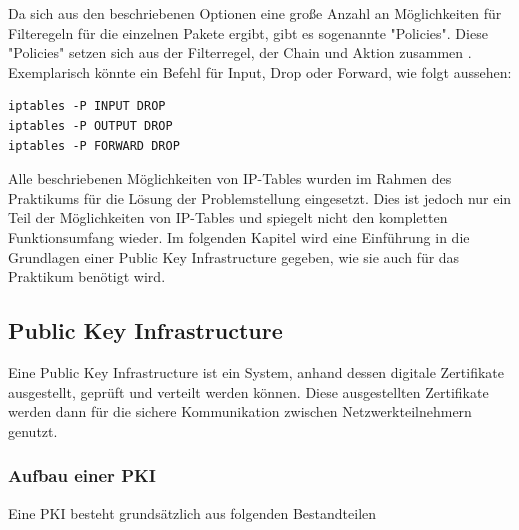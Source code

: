 \documentclass[
a4paper,     %
 headsepline, %
footsepline, %
titlepage,   %
 halfparskip,     %
 fleqn,       %
12pt         %
]{scrartcl}  %
\begin{document}
Da sich aus den beschriebenen Optionen eine große Anzahl an Möglichkeiten für Filteregeln für die einzelnen Pakete ergibt, gibt es sogenannte "Policies". Diese "Policies" setzen sich aus der Filterregel, der Chain und Aktion zusammen \cite{iptables-1}. Exemplarisch könnte ein Befehl für Input, Drop oder Forward, wie folgt aussehen: 
\begin{lstlisting}[caption={Policies},label=lst:policy]
iptables -P INPUT DROP
iptables -P OUTPUT DROP
iptables -P FORWARD DROP
\end{lstlisting}

Alle beschriebenen Möglichkeiten von IP-Tables wurden im Rahmen des Praktikums für die Lösung der Problemstellung eingesetzt. Dies ist jedoch nur ein Teil der Möglichkeiten von IP-Tables und spiegelt nicht den kompletten Funktionsumfang wieder. 
Im folgenden Kapitel wird eine Einführung in die Grundlagen einer Public Key Infrastructure gegeben, wie sie auch für das Praktikum benötigt wird.
\subsection{Public Key Infrastructure}\label{PKI}
Eine Public Key Infrastructure ist ein System, anhand dessen digitale Zertifikate ausgestellt, geprüft und verteilt werden können. Diese ausgestellten Zertifikate werden dann für die sichere Kommunikation zwischen Netzwerkteilnehmern genutzt.
\subsubsection{Aufbau einer PKI}
Eine PKI besteht grundsätzlich aus folgenden Bestandteilen
\end{document}
